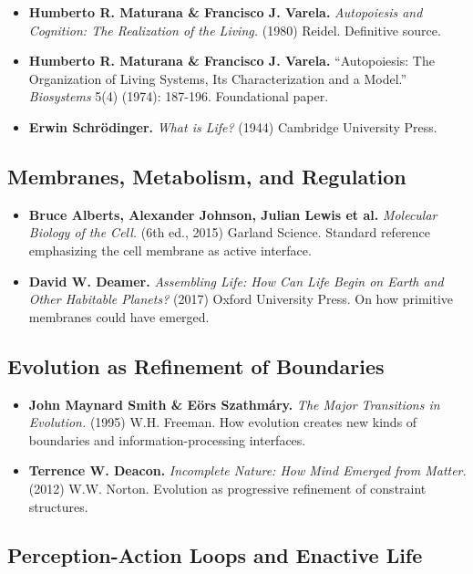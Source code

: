 \documentclass[
  openright]{book}
\begin{document}
\begin{itemize}
\item
  \textbf{Humberto R. Maturana \& Francisco J. Varela.}
  \emph{Autopoiesis and Cognition: The Realization of the Living.}
  (1980) Reidel. Definitive source.
\item
  \textbf{Humberto R. Maturana \& Francisco J. Varela.} ``Autopoiesis:
  The Organization of Living Systems, Its Characterization and a
  Model.'' \emph{Biosystems} 5(4) (1974): 187-196. Foundational paper.
\item
  \textbf{Erwin Schrödinger.} \emph{What is Life?} (1944) Cambridge
  University Press.
\end{itemize}

\subsection{Membranes, Metabolism, and
Regulation}\label{membranes-metabolism-and-regulation}

\begin{itemize}
\item
  \textbf{Bruce Alberts, Alexander Johnson, Julian Lewis et al.}
  \emph{Molecular Biology of the Cell.} (6th ed., 2015) Garland Science.
  Standard reference emphasizing the cell membrane as active interface.
\item
  \textbf{David W. Deamer.} \emph{Assembling Life: How Can Life Begin on
  Earth and Other Habitable Planets?} (2017) Oxford University Press. On
  how primitive membranes could have emerged.
\end{itemize}

\subsection{Evolution as Refinement of
Boundaries}\label{evolution-as-refinement-of-boundaries}

\begin{itemize}
\item
  \textbf{John Maynard Smith \& Eörs Szathmáry.} \emph{The Major
  Transitions in Evolution.} (1995) W.H. Freeman. How evolution creates
  new kinds of boundaries and information-processing interfaces.
\item
  \textbf{Terrence W. Deacon.} \emph{Incomplete Nature: How Mind Emerged
  from Matter.} (2012) W.W. Norton. Evolution as progressive refinement
  of constraint structures.
\end{itemize}

\subsection{Perception-Action Loops and Enactive
Life}\label{perception-action-loops-and-enactive-life}
\end{document}
